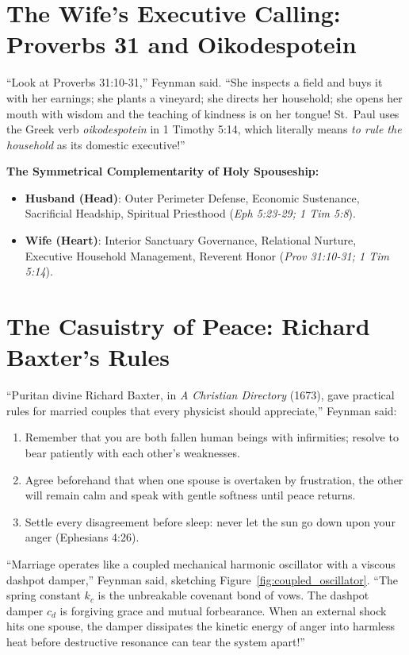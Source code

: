 \documentclass[11pt]{report}
\begin{document}
\section{The Wife's Executive Calling: Proverbs 31 and Oikodespotein}
``Look at Proverbs 31:10-31,'' Feynman said. ``She inspects a field and buys it with her earnings; she plants a vineyard; she directs her household; she opens her mouth with wisdom and the teaching of kindness is on her tongue! St.~Paul uses the Greek verb \textit{oikodespotein} in 1 Timothy 5:14, which literally means \textit{to rule the household} as its domestic executive!''

\begin{blackboard}
\textbf{The Symmetrical Complementarity of Holy Spouseship:}
\begin{itemize}
    \item \textbf{Husband (Head)}: Outer Perimeter Defense, Economic Sustenance, Sacrificial Headship, Spiritual Priesthood (\textit{Eph 5:23-29; 1 Tim 5:8}).
    \item \textbf{Wife (Heart)}: Interior Sanctuary Governance, Relational Nurture, Executive Household Management, Reverent Honor (\textit{Prov 31:10-31; 1 Tim 5:14}).
\end{itemize}
\end{blackboard}

\section{The Casuistry of Peace: Richard Baxter's Rules}
``Puritan divine Richard Baxter, in \textit{A Christian Directory} (1673), gave practical rules for married couples that every physicist should appreciate,'' Feynman said:
\begin{enumerate}
    \item Remember that you are both fallen human beings with infirmities; resolve to bear patiently with each other's weaknesses.
    \item Agree beforehand that when one spouse is overtaken by frustration, the other will remain calm and speak with gentle softness until peace returns.
    \item Settle every disagreement before sleep: never let the sun go down upon your anger (Ephesians 4:26).
\end{enumerate}

``Marriage operates like a coupled mechanical harmonic oscillator with a viscous dashpot damper,'' Feynman said, sketching Figure~\ref{fig:coupled_oscillator}. ``The spring constant $k_c$ is the unbreakable covenant bond of vows. The dashpot damper $c_d$ is forgiving grace and mutual forbearance. When an external shock hits one spouse, the damper dissipates the kinetic energy of anger into harmless heat before destructive resonance can tear the system apart!''
\end{document}
